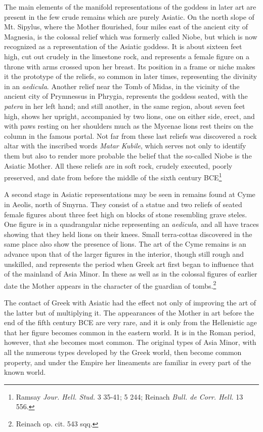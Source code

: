 \documentclass[a4paper, 11pt, oneside, polutonikogreek, french]{article}
\begin{document}
The main elements of the manifold representations of the goddess in later art are present in the few crude remains which are purely Asiatic. On the north slope of Mt. Sipylus, where the Mother flourished, four miles east of the ancient city of Magnesia, is the colossal relief which was formerly called Niobe, but which is now recognized as a representation of the Asiatic goddess. It is about sixteen feet high, cut out crudely in the limestone rock, and represents a female figure on a throne with arms crossed upon her breast. Its position in a frame or niche makes it the prototype of the reliefs, so common in later times, representing the divinity in an \emph{aedicula}. Another relief near the Tomb of Midas, in the vicinity of the ancient city of Prymnessus in Phrygia, represents the goddess seated, with the \emph{patera} in her left hand; and still another, in the same region, about seven feet high, shows her upright, accompanied by two lions, one on either side, erect, and with paws resting on her shoulders much as the Mycenae lions rest theirs on the column in the famous portal. Not far from these last reliefs was discovered a rock altar with the inscribed words \emph{Matar Kubile}, which serves not only to identify them but also to render more probable the belief that the so-called Niobe is the Asiatic Mother. All these reliefs are in soft rock, crudely executed, poorly preserved, and date from before the middle of the sixth century \textsc{BCE}\footnote{Ramsay \emph{Jour. Hell. Stud.} 3 35-41; 5 244; Reinach \emph{Bull. de Corr. Hell.} 13 556.}

A second stage in Asiatic representations may be seen in remains found at Cyme in Aeolis, north of Smyrna. They consist of a statue and two reliefs of seated female figures about three feet high on blocks of stone resembling grave steles. One figure is in a quadrangular niche representing an \emph{aedicula}, and all have traces showing that they held lions on their knees. Small terra-cottas discovered in the same place also show the presence of lions. The art of the Cyme remains is an advance upon that of the larger figures in the interior, though still rough and unskilled, and represents the period when Greek art first began to influence that of the mainland of Asia Minor. In these as well as in the colossal figures of earlier date the Mother appears in the character of the guardian of tombs.\footnote{Reinach op. cit. 543 sqq.}

The contact of Greek with Asiatic had the effect not only of improving the art of the latter but of multiplying it. The appearances of the Mother in art before the end of the fifth century \textsc{BCE} are very rare, and it is only from the Hellenistic age that her figure becomes common in the eastern world. It is in the Roman period, however, that she becomes most common. The original types of Asia Minor, with all the numerous types developed by the Greek world, then become common property, and under the Empire her lineaments are familiar in every part of the known world.
\end{document}
